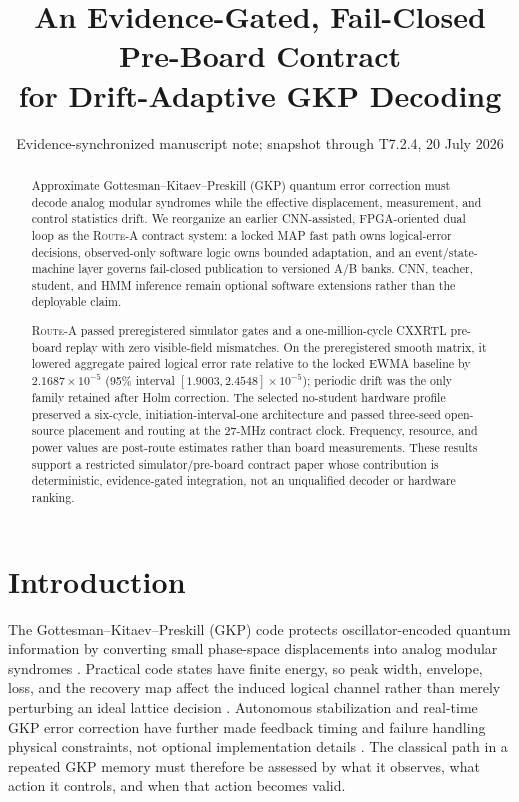 \documentclass[11pt]{article}
\title{An Evidence-Gated, Fail-Closed Pre-Board Contract\\
for Drift-Adaptive GKP Decoding}
\author{}
\date{Evidence-synchronized manuscript note; snapshot through T7.2.4, 20 July 2026}
\newcommand{\RouteA}{\textsc{Route-A}}
\begin{document}
\maketitle

\begin{abstract}
Approximate Gottesman--Kitaev--Preskill (GKP) quantum error correction must
decode analog modular syndromes while the effective displacement, measurement,
and control statistics drift.  We reorganize an earlier CNN-assisted,
FPGA-oriented dual loop as the \RouteA{} contract system: a locked MAP fast
path owns logical-error decisions, observed-only software logic owns bounded
adaptation, and an event/state-machine layer governs fail-closed publication to
versioned A/B banks.  CNN, teacher, student, and HMM inference remain optional
software extensions rather than the deployable claim.

\RouteA{} passed preregistered simulator gates and a one-million-cycle CXXRTL
pre-board replay with zero visible-field mismatches.  On the preregistered
smooth matrix, it lowered aggregate paired logical error rate relative to the
locked EWMA baseline by $2.1687\times10^{-5}$ (95\% interval
$[1.9003,2.4548]\times10^{-5}$); periodic drift was the only family retained
after Holm correction.  The selected no-student hardware profile preserved a
six-cycle, initiation-interval-one architecture and passed three-seed
open-source placement and routing at the 27-MHz contract clock.  Frequency,
resource, and power values are post-route estimates rather than board
measurements.  These results support a restricted simulator/pre-board contract
paper whose contribution is deterministic, evidence-gated integration, not an
unqualified decoder or hardware ranking.
\end{abstract}

\tableofcontents

\section{Introduction}

The Gottesman--Kitaev--Preskill (GKP) code protects oscillator-encoded quantum
information by converting small phase-space displacements into analog modular
syndromes \cite{gkp2001,grimsmo2021}.  Practical code states have finite energy,
so peak width, envelope, loss, and the recovery map affect the induced logical
channel rather than merely perturbing an ideal lattice decision
\cite{hastrup2023,jafarzadeh2025}.  Autonomous stabilization and real-time GKP
error correction have further made feedback timing and failure handling physical
constraints, not optional implementation details \cite{lachance2024,sivak2023}.
The classical path in a repeated GKP memory must therefore be assessed by what
it observes, what action it controls, and when that action becomes valid.
\end{document}
